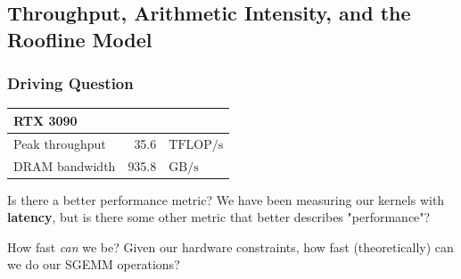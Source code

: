\documentclass[../main.tex]{subfiles}
\begin{document}
\newcommand{\gpuModel}{RTX 3090}
\newcommand{\peakThroughputValue}{35.6}
\newcommand{\TFLOPS}{\ensuremath{\mathrm{TFLOP/s}}}
\newcommand{\GBS}{\ensuremath{\mathrm{GB/s}}}
\newcommand{\dramBandwidthValue}{935.8}
\newcommand{\peakThroughput}{\ensuremath{\peakThroughputValue\,\TFLOPS}}
\newcommand{\dramBandwidth}{\ensuremath{\dramBandwidthValue\,\GBS}}
\newcommand{\hardwareSpecifications}{%
  \begin{center}
    \begin{tabular}{l|rl}
      \gpuModel \\
      \hline
      Peak throughput & \peakThroughputValue & \TFLOPS\\
      DRAM bandwidth & \dramBandwidthValue & \GBS\\
    \end{tabular}
  \end{center}%
}

\subsection{Throughput, Arithmetic Intensity, and the Roofline Model}

\begin{frame}
  \frametitle{Driving Question}
  \hardwareSpecifications

  \begin{alertblock}{Is there a better performance metric?}
    We have been measuring our kernels with \textbf{latency}, but is there some
    other metric that better describes "performance"?
  \end{alertblock}

  \pause
  \begin{alertblock}{How fast \emph{can} we be?}
    Given our hardware constraints, how fast (theoretically) can we do our SGEMM operations?
  \end{alertblock}
\end{frame}
\end{document}
